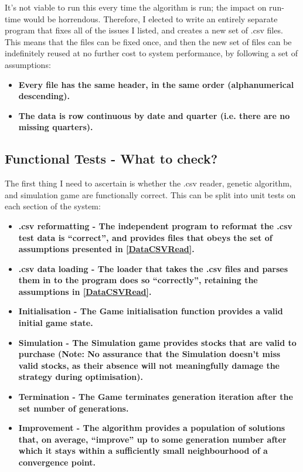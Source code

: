 It's not viable to run this every time the algorithm is run; the impact on run-time would be horrendous. Therefore, I elected to write an entirely separate program that fixes all of the issues I listed, and creates a new set of .csv files. This means that the files can be fixed once, and then the new set of files can be indefinitely reused at no further cost to system performance, by following a set of assumptions:
\begin{itemize}
    \item \bf Every file has the same header, in the same order (alphanumerical descending). \rm
    \item \bf The data is row continuous by date and quarter (i.e. there are no missing quarters). \rm
\end{itemize}

\subsection{Functional Tests - What to check?}
The first thing I need to ascertain is whether the .csv reader, genetic algorithm, and simulation game are functionally correct. This can be split into unit tests on each section of the system:
\begin{itemize}
    \item \bf .csv reformatting \rm - The independent program to reformat the .csv test data is ``correct'', and provides files that obeys the set of assumptions presented in \ref{DataCSVRead}.
    \item \bf .csv data loading \rm - The loader that takes the .csv files and parses them in to the program does so ``correctly'', retaining the assumptions in \ref{DataCSVRead}.
    \item \bf Initialisation \rm - The Game initialisation function provides a valid initial game state.
    \item \bf Simulation \rm - The Simulation game provides stocks that are valid to purchase (Note: No assurance that the Simulation doesn't miss valid stocks, as their absence will not meaningfully damage the strategy during optimisation).
    \item \bf Termination \rm - The Game terminates generation iteration after the set number of generations.
    \item \bf Improvement \rm - The algorithm provides a population of solutions that, on average, ``improve'' up to some generation number after which it stays within a sufficiently small neighbourhood of a convergence point.
\end{itemize}

